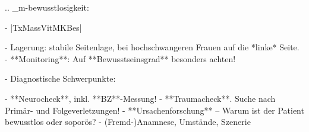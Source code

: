 
.. _m-bewusstlosigkeit:


\label{proc:MR40021B}
\begin{itemize}
  -   |TxMassVitMKBes|
  \begin{itemize}
    -   Lagerung: stabile Seitenlage, bei hochschwangeren Frauen auf die
    *linke* Seite.
    -   **Monitoring**: Auf **Bewusstseinsgrad**
    besonders achten!
  \end{itemize}
  -   Diagnostische Schwerpunkte:
  \begin{itemize}
    -   **Neurocheck**, inkl. **BZ**-Messung!
    -   **Traumacheck**. Suche nach Primär- und
    Folgeverletzungen!
    -   **Ursachenforschung** -- Warum ist der Patient bewusstlos oder
    soporös?
    -   (Fremd-)Anamnese, Umstände, Szenerie
  \end{itemize}
\end{itemize}

